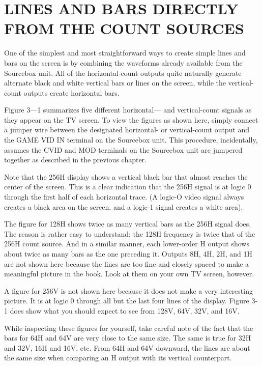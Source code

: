 \documentclass[11pt]{book}              %
\begin{document}
\section{LINES AND BARS DIRECTLY FROM THE COUNT SOURCES}

One of the simplest and most straightforward ways to create simple lines and bars on the screen is by combining the waveforms already available from the Sourcebox unit. All of the horizontal-count outputs quite naturally generate alternate black and white vertical bars or lines on the screen, while the vertical-count outputs create horizontal bars.

Figure 3—1 summarizes five different horizontal— and vertical-count signals as they appear on the TV screen. To view the figures as shown here, simply connect a jumper wire between the designated horizontal- or vertical-count output and the GAME VID IN terminal on the Sourcebox unit. This procedure, incidentally, assumes the CVID and MOD terminals on the Sourcebox unit are jumpered together as described in the previous chapter.

Note that the 256H display shows a vertical black bar that almost reaches the center of the screen. This is a clear indication that the 256H signal is at logic 0 through the first half of each horizontal trace. (A logic-O video signal always creates a black area on the screen, and a logic-1 signal creates a white area).

The figure for 128H shows twice as many vertical bars as the 256H signal does. The reason is rather easy to understand: the 128H frequency is twice that of the 256H count source. And in a similar manner, each lower-order H output shows about twice as many bars as the one preceding it. Outputs 8H, 4H, 2H, and 1H are not shown here because the lines are too fine and closely spaced to make a meaningful picture in the book. Look at them on your own TV screen, however.

A figure for 256V is not shown here because it does not make a very interesting picture. It is at logic 0 through all but the last four lines of the display. Figure 3-1 does show what you should expect to see from 128V, 64V, 32V, and 16V.

While inspecting these figures for yourself, take careful note of the fact that the bars for 64H and 64V are very close to the same size. The same is true for 32H and 32V, 16H and 16V, etc. From 64H and 64V downward, the lines are about the same size when comparing an H output with its vertical counterpart.
\end{document}

